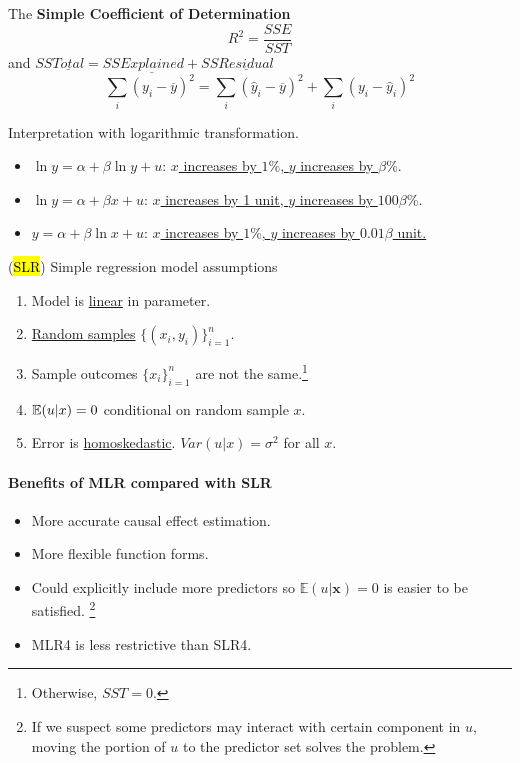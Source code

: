 \documentclass[]{article}
\begin{document}
	\begin{definition}
	    The \textbf{Simple Coefficient of Determination}
	    \[
	        R^2 = \frac{SSE}{SST}
	    \]
	    and $SS\underline{Total} = SS\underline{Explained} + SS\underline{Residual}$
	    \[
	        \sum_i {(y_i - \overline{y})^2} = \sum_i {(\hat{y}_i - \overline{y})^2} + \sum_i {(y_i - \hat{y}_i)^2}
	    \]
	\end{definition}
	
	\begin{proposition}[Logarithms] Interpretation with logarithmic transformation.
	    \begin{itemize}
	        \item $\ln{y} = \alpha + \beta \ln{y} + u$: \ul{$x$ increases by $1\%$, $y$ increases by $\beta \%$}.
	        \item $\ln{y} = \alpha + \beta x + u$: \ul{$x$ increases by 1 unit, $y$ increases by $100 \beta \%$}.
	        \item $y = \alpha + \beta \ln{x} + u$: \ul{$x$ increases by $1\%$, $y$ increases by $0.01\beta$ unit.}
	    \end{itemize}
	\end{proposition}
	
	\begin{assumption}(\hl{SLR})
	    Simple regression model assumptions
	    \begin{enumerate}
	        \item Model is \ul{linear} in parameter.
	        \item \ul{Random samples} $\{(x_i, y_i)\}_{i=1}^n$.
	        \item Sample outcomes $\{x_i\}_{i=1}^n$ are not the same.\footnote{Otherwise, $SST=0$.}
	        \item $\mathbb{E}({u|x})=0$ conditional on random sample $x$.
	        \item Error is \ul{homoskedastic}. $Var(u|x) = \sigma^2$ for all $x$.
	    \end{enumerate}
	\end{assumption}
	\paragraph{Benefits of MLR compared with SLR}
	    \begin{itemize}
	        \item More accurate causal effect estimation.
	        \item More flexible function forms.
	        \item Could explicitly include more predictors so $\mathbb{E}(u|\textbf{x}) = 0$ is easier to be satisfied. \footnote{If we suspect some predictors may interact with certain component in $u$, moving the portion of $u$ to the predictor set solves the problem.}
	        \item MLR4 is less restrictive than SLR4.
	    \end{itemize}
	   
\end{document}
